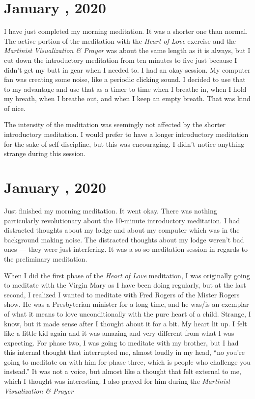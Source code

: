 \documentclass[b6paper]{article}
\begin{document}
\pagebreak{}\section*{January , 2020}

I have just completed my morning meditation. It was a shorter one than normal. The active portion of the meditation with the \textit{Heart of Love} exercise and the \textit{Martinist Visualization \& Prayer} was about the same length as it is always, but I cut down the introductory meditation from ten minutes to five just because I didn't get my butt in gear when I needed to. I had an okay session. My computer fan was creating some noise, like a periodic clicking sound. I decided to use that to my advantage and use that as a timer to time when I breathe in, when I hold my breath, when I breathe out, and when I keep an empty breath. That was kind of nice. 

The intensity of the meditation was seemingly not affected by the shorter introductory meditation. I would prefer to have a longer introductory meditation for the sake of self-discipline, but this was encouraging. I didn't notice anything strange during this session.

\pagebreak{}\section*{January , 2020}

Just finished my morning meditation. It went okay. There was nothing particularly revolutionary about the 10-minute introductory meditation.  I had distracted thoughts about my lodge and about my computer which was in the background making noise. The distracted thoughts about my lodge weren't bad ones --- they were just interfering. It was a so-so meditation session in regards to the preliminary meditation.

When I did the first phase of the \textit{Heart of Love} meditation, I was originally going to meditate with the Virgin Mary as I have been doing regularly, but at the last second, I realized I wanted to meditate with Fred Rogers of the Mister Rogers show. He was a Presbyterian minister for a long time, and he was/is an exemplar of what it means to love unconditionally with the pure heart of a child. Strange, I know, but it made sense after I thought about it for a bit. My heart lit up. I felt like a little kid again and it was amazing and very different from what I was expecting. For phase two, I was going to meditate with my brother, but I had this internal thought that interrupted me, almost loudly in my head, ``no you're going to meditate on with him for phase three, which is people who challenge you instead.'' It was not a voice, but almost like a thought that felt external to me, which I thought was interesting. I also prayed for him during the \textit{Martinist Visualization \& Prayer}
\end{document}
